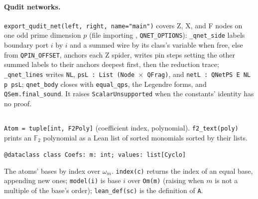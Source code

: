 \paragraph{Qudit networks.} \textnormal{\texttt{export\_\allowbreak{}qudit\_\allowbreak{}net(\allowbreak{}left,\allowbreak{} right,\allowbreak{} name="main")}} covers Z, X, and F
nodes on one odd prime dimension $p$ (file importing ,
\textnormal{\texttt{QNET\_\allowbreak{}OPTIONS}}): \textnormal{\texttt{\_\allowbreak{}qnet\_\allowbreak{}side}} labels boundary port $i$ by $i$ and a summed wire by its
class's variable when free, else from \textnormal{\texttt{QPIN\_\allowbreak{}OFFSET}}, anchors each Z spider, writes pin steps
setting the other summed labels to their anchors deepest first, then the reduction trace;
\textnormal{\texttt{\_\allowbreak{}qnet\_\allowbreak{}lines}} writes \textnormal{\texttt{NL}}, \textnormal{\texttt{psL : List (\allowbreak{}Node \ensuremath{\times} QFrag)}}, and
\textnormal{\texttt{netL : QNetPS E NL p psL}}; \textnormal{\texttt{qnet\_\allowbreak{}body}} closes with \textnormal{\texttt{equal\_\allowbreak{}qps}}, the Legendre forms, and
\textnormal{\texttt{QSem.\allowbreak{}final\_\allowbreak{}sound}}. It raises \textnormal{\texttt{ScalarUnsupported}} when the constants' identity has no
proof.

\subsection{\texorpdfstring{}{lean\_amp}}\label{sec:lean-pathsum-python-amp}

\textnormal{\texttt{Atom = tuple[int,\allowbreak{} F2Poly]}} (coefficient index, polynomial). \textnormal{\texttt{f2\_\allowbreak{}text(\allowbreak{}poly)}} prints an
$\mathbb F_2$ polynomial as a Lean list of sorted monomials sorted by their lists.

\begin{signature}
\textnormal{\texttt{@dataclass class Coefs: m: int; values: list[Cyclo]}}
\end{signature}
\noindent The atoms' bases by index over $\omega_m$. \textnormal{\texttt{index(\allowbreak{}c)}} returns the index of an equal
base, appending new ones; \textnormal{\texttt{model(\allowbreak{}i)}} is base $i$ over \textnormal{\texttt{Om(\allowbreak{}m)}} (raising when $m$ is not a
multiple of the base's order); \textnormal{\texttt{lean\_\allowbreak{}def(\allowbreak{}sc)}} is the definition of \textnormal{\texttt{A}}.

